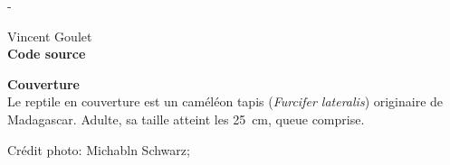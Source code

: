 \begingroup
\calccentering{\unitlength}
\begin{adjustwidth*}{\unitlength}{-\unitlength}
  \setlength{\parindent}{0pt}
  \setlength{\parskip}{\baselineskip}

  {\textcopyright} {\year} Vincent Goulet \\

  

  \textbf{Code source} \\
  \viewsource{\ghurl}

  \textbf{Couverture} \\
  Le reptile en couverture est un caméléon tapis (\emph{Furcifer
    lateralis}) originaire de Madagascar. Adulte, sa taille atteint
  les 25~cm, queue comprise.

  Crédit photo: Michabln Schwarz; 
\end{adjustwidth*}
\endgroup

